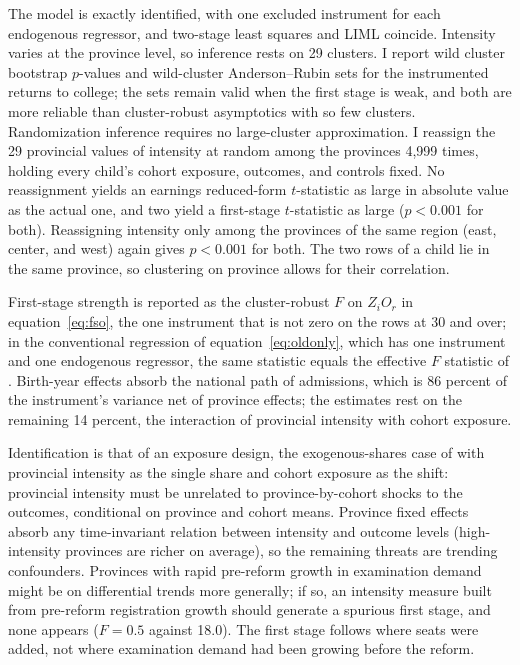 \documentclass[11pt]{article}
\begin{document}
The model is exactly identified, with one excluded instrument
for each endogenous regressor, and
two-stage least squares and LIML coincide. Intensity varies at
the province level, so inference rests on 29 clusters. I
report wild cluster bootstrap $p$-values \citep[Rademacher weights by
province, null imposed, 9,999 replications;][]{CameronGelbachMiller2008} and wild-cluster
Anderson--Rubin sets for the instrumented returns to college; the sets remain valid when the first stage is weak, and both are more reliable than cluster-robust asymptotics with so few clusters. Randomization inference requires no large-cluster approximation. I reassign the 29 provincial values of intensity at random among the provinces 4,999 times, holding every child's cohort exposure, outcomes, and controls fixed. No reassignment yields an earnings reduced-form $t$-statistic as large in absolute value as the actual one, and two yield a first-stage $t$-statistic as large ($p < 0.001$ for both). Reassigning intensity only among the provinces of the same region (east, center, and west) again gives $p < 0.001$ for both. The
two rows of a child lie in the same province, so clustering on province
allows for their correlation.

First-stage strength is reported as the
cluster-robust $F$ on $Z_i O_r$ in equation~\eqref{eq:fso}, the one instrument that is not zero on the rows at 30 and over; in the
conventional regression of equation~\eqref{eq:oldonly}, which has one instrument and one
endogenous regressor, the same statistic equals the effective $F$ statistic of
\citet{OleaPflueger2013}. Birth-year effects absorb the national path of admissions, which is 86 percent of the instrument's variance net of province effects; the estimates rest on the remaining 14 percent, the interaction of provincial intensity with cohort exposure.

Identification is that of an exposure design, the exogenous-shares case of
\citet{GoldsmithPinkham2020} with provincial intensity as the single share and cohort exposure as the shift: provincial intensity must be unrelated to
province-by-cohort shocks to the outcomes, conditional on province and
cohort means. Province fixed effects absorb any time-invariant relation
between intensity and outcome levels (high-intensity provinces are
richer on average), so the remaining threats are trending confounders.
Provinces with rapid pre-reform growth in examination demand might be
on differential trends more generally; if so, an intensity measure built from pre-reform registration growth should generate a spurious first stage, and none appears ($F = 0.5$ against 18.0). The first stage follows where seats were added, not where examination demand had been growing before the reform.
\end{document}
